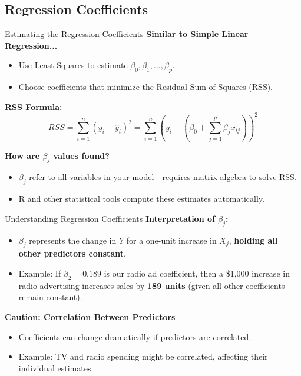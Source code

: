 \documentclass[aspectratio=169,xcolor=dvipsnames]{beamer}
\begin{document}
\subsection{Regression Coefficients}
\begin{frame}{Estimating the Regression Coefficients}
    \textbf{Similar to Simple Linear Regression...}
    \begin{itemize}
        \item Use Least Squares to estimate \( \beta_0, \beta_1, ..., \beta_p \).
        \item Choose coefficients that minimize the Residual Sum of Squares (RSS).
    \end{itemize}

    \bigskip
    
    \textbf{RSS Formula:}
    \begin{equation}
        RSS = \sum_{i=1}^{n} (y_i - \hat{y}_i)^2 = \sum_{i=1}^{n} (y_i - (\beta_0 + \sum_{j=1}^{p} \beta_j x_{ij}))^2
    \end{equation}

    \bigskip

    \textbf{How are \( \beta_j \) values found?}
    \begin{itemize}
        \item $\beta_j$ refer to all variables in your model - requires matrix algebra to solve RSS.
        \item R and other statistical tools compute these estimates automatically.
    \end{itemize}
\end{frame}

\begin{frame}{Understanding Regression Coefficients}
    \textbf{Interpretation of \( \beta_j \):}
    \begin{itemize}
        \item \( \beta_j \) represents the change in \( Y \) for a one-unit increase in \( X_j \), \textbf{holding all other predictors constant}.
        \item Example: If \( \beta_2 = 0.189 \) is our radio ad coefficient, then a \$1,000 increase in radio advertising increases sales by \textbf{189 units} (given all other coefficients remain constant).
    \end{itemize}

    \bigskip

    \textbf{Caution: Correlation Between Predictors}
    \begin{itemize}
        \item Coefficients can change dramatically if predictors are correlated.
        \item Example: TV and radio spending might be correlated, affecting their individual estimates.
    \end{itemize}
\end{frame}
\end{document}
